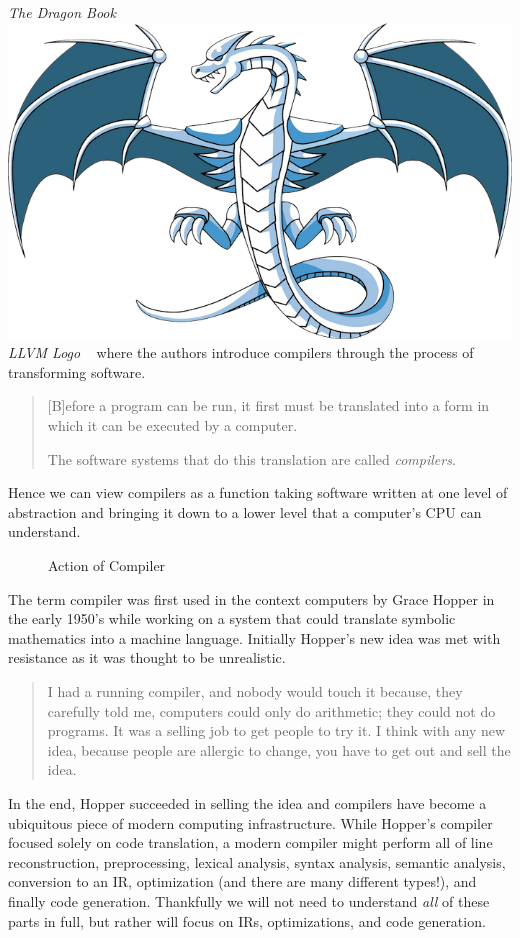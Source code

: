 {    \emph{The Dragon Book}
    \includegraphics[width=\marginparwidth]{img/llvmlogo.png}
    \emph{LLVM Logo}
}~\cite{dragonbook} where the authors introduce compilers through the process of transforming software.
\begin{quotation}
    [B]efore a program can be run, it first must be translated into a form in which it can be executed by a computer.

    The software systems that do this translation are called \emph{compilers}.
\end{quotation}
Hence we can view compilers as a function taking software written at one level of abstraction and bringing it down to a lower level that a computer's \ac{CPU} can understand.
\begin{figure}[ht]
    \centering
    
    \caption{Action of Compiler}\label{fig:compiler}
\end{figure}

The term compiler was first used in the context computers by Grace Hopper in the early 1950's while working on a system that could translate symbolic mathematics into a machine language.
Initially Hopper's new idea was met with resistance as it was thought to be unrealistic.
\begin{quotation}
    I had a running compiler, and nobody would touch it because, they carefully told me, computers could only do arithmetic; they could not do programs.
    It was a selling job to get people to try it.
    I think with any new idea, because people are allergic to change, you have to get out and sell the idea.
\end{quotation}
In the end, Hopper succeeded in selling the idea and compilers have become a ubiquitous piece of modern computing infrastructure.
While Hopper's compiler focused solely on code translation, a modern compiler might perform all of line reconstruction, preprocessing, lexical analysis, syntax analysis, semantic analysis, conversion to an \acf{IR}, optimization (and there are many different types!), and finally code generation.
Thankfully we will not need to understand \emph{all} of these parts in full, but rather will focus on \aclp{IR}, optimizations, and code generation.

